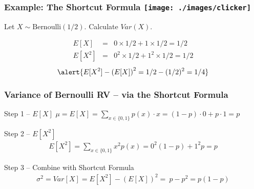 \begin{frame}
\frametitle{Example: The Shortcut Formula \hfill \texttt{[image: ./images/clicker]}}
Let $X\sim \mbox{Bernoulli}(1/2)$.
Calculate $Var(X)$.

\pause
\begin{eqnarray*}
    E[X] &=&  0 \times 1/2 + 1 \times 1/2 = 1/2\\ 
    E[X^2] &=&  0^2 \times 1/2 + 1^2 \times 1/2 = 1/2
\end{eqnarray*}
\pause
\[
  \alert{E[X^2] - \left( E[X] \right)^2 = 1/2 - (1/2)^2 =  1/4}
\]
\end{frame}


\begin{frame}
\frametitle{Variance of Bernoulli RV -- via the Shortcut Formula}

\begin{block}{Step 1 -- $E[X]$} 
$\mu = E[X] = \displaystyle \sum_{x \in \{0,1\}} p(x) \cdot x = (1-p) \cdot 0 + p \cdot 1 = p$
\end{block}


\begin{block}{Step 2 -- $E[X^2]$} 
\begin{eqnarray*}
	E[X^2] = \sum_{x \in \{0,1\}} x^2 p(x) = 0^2 (1-p) + 1^2 p = p
\end{eqnarray*}
\end{block}


\begin{block}{Step 3 -- Combine with Shortcut Formula} 
\begin{eqnarray*}
	\sigma^2 = Var[X] = E[X^2] - \left(E[X]\right)^2 = \ p - p^2 =  p(1-p)
\end{eqnarray*}
\end{block}


\end{frame}
%
%
%

